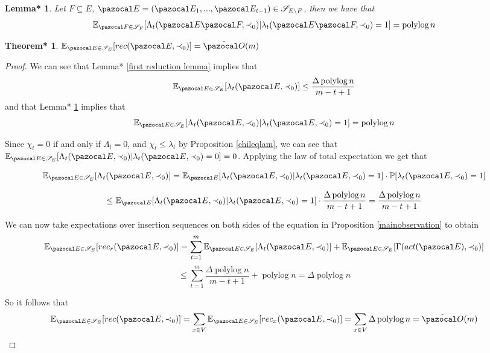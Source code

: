\documentclass{report}
\newtheorem{theorem*}{Theorem*}[section]
\newtheorem{lemma*}[theorem]{Lemma*}
\DeclareMathOperator*{\polylog}{polylog}
\begin{document}
\begin{lemma*}\label{second reduction lemma} 
Let $F \subseteq E$, $\pazocal E = (\pazocal E_1,...,\pazocal E_{t-1}) \in \mathcal S_{E \setminus F}$, then we have that
\[ \mathbb E_{\pazocal F \in \mathcal S_F} [\Lambda_t(\pazocal E \pazocal F, \prec_0) \vert \lambda_t(\pazocal E \pazocal F, \prec_0) = 1] = \polylog n\]
\end{lemma*}

\begin{theorem*}\label{second reduction lemma} 
$\mathbb E_{\pazocal E \in \mathcal S_E}[rec(\pazocal E, \prec_0)] = \tilde{\pazocal O}(m)$
\end{theorem*}

\begin{proof}
We can see that Lemma* \ref{first reduction lemma} implies that
\[ \mathbb E_{\pazocal E \in \mathcal S_E}[\lambda_t(\pazocal E, \prec_0)] \leq \frac{\Delta\polylog n}{m-t+1} \]
and that Lemma* \ref{second reduction lemma} implies that
\[ \mathbb E_{\pazocal E \in \mathcal S_E}[\Lambda_t(\pazocal E, \prec_0) \vert \lambda_t(\pazocal E, \prec_0) = 1] = \polylog n\]

Since $\chi_t = 0$ if and only if $\Lambda_t = 0$, and $\chi_t \leq \lambda_t$ by Proposition \ref{chileqlam}, we can see that $\mathbb E_{\pazocal E \in \mathcal S_E}[\Lambda_t(\pazocal E, \prec_0) \vert \lambda_t(\pazocal E, \prec_0) = 0] = 0$. Applying the law of total expectation we get that

\[ \mathbb E_{\pazocal E \in \mathcal S_E} [\Lambda_t(\pazocal E, \prec_0)]  = \mathbb E_{\pazocal E} [\Lambda_t(\pazocal E, \prec_0) \vert \lambda_t(\pazocal E, \prec_0) = 1] \cdot \mathbb P [\lambda_t(\pazocal E, \prec_0) = 1] \]

\[ \leq \mathbb E_{\pazocal E} [\Lambda_t(\pazocal E, \prec_0) \vert \lambda_t(\pazocal E, \prec_0) = 1] \cdot \frac{\Delta\polylog n}{m-t+1} = \frac{\Delta\polylog n}{m-t+1} \]

We can now take expectations over insertion sequences on both sides of the equation in Proposition \ref{mainobservation} to obtain
\[ \mathbb E_{\pazocal E \in \mathcal S_E}[rec_r(\pazocal E, \prec_0)] =  \sum_{t=1}^{m} \mathbb E_{\pazocal E \in \mathcal S_E}[ \Lambda_t(\pazocal E, \prec_0) ] + \mathbb E_{\pazocal E \in \mathcal S_E}[\Gamma(act(\pazocal E), \prec_0)] \]
\[ \leq \sum_{t=1}^{m} \frac{\Delta\polylog n}{m-t+1} + \polylog n = \Delta \polylog n \]

So it follows that
\[ \mathbb E_{\pazocal E \in \mathcal S_E}[rec(\pazocal E, \prec_0)] = \sum_{x \in V} \mathbb E_{\pazocal E \in \mathcal S_E}[rec_x(\pazocal E, \prec_0)] = \sum_{x \in V} \Delta \polylog n = \tilde{\pazocal O}(m) \]
\end{proof}
\end{document}
